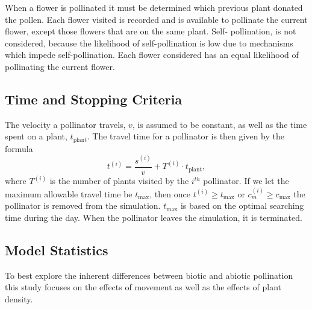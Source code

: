 When a flower is pollinated it must be determined which previous plant donated
the pollen. Each flower visited is recorded and is available to pollinate the
current flower, except those flowers that are on the same plant. Self-
pollination, is not considered, because the likelihood of self-pollination is
low due to mechanisms which impede self-pollination. Each flower considered has
an equal likelihood of pollinating the current flower.

\subsection{Time and Stopping Criteria}
The velocity a pollinator travels, $v$, is assumed to be constant, as well as
the time spent on a plant, $t_{\text{plant}}$.  The travel time for a pollinator is
then given by the formula
\begin{equation*}
  t^{\left(i\right)} = \frac{s^{\left(i\right)}}{v} + T^{\left(i\right)} \cdot t_{\text{plant}},
\end{equation*}
where $T^{\left(i\right)}$ is the number of plants visited by the $i^{th}$
pollinator. If we let the maximum allowable travel time be $t_{\text{max}}$, then once
$t^{\left(i\right)} \geq t_{\text{max}}$ or $c^{\left(i\right)}_m \geq c_{\text{max}}$ the
pollinator is removed from the simulation. $t_{\text{max}}$ is based on the optimal
searching time during the day.  When the pollinator leaves the simulation, it is
terminated.

\subsection{Model Statistics}
To best explore the inherent differences between biotic and abiotic pollination
this study focuses on the effects of movement as well as the effects of plant
density.

